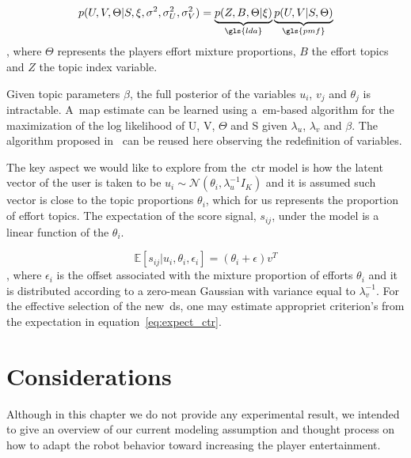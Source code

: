 \begin{equation}
    p(U,V,\Theta|S,\xi,\sigma^{2},\sigma_{U}^{2},\sigma_{V}^{2}) = \underbrace{p(Z,B, \Theta | \xi)}_{\gls{lda}} \underbrace{p(U,V|S,\Theta)}_{\gls{pmf}}
\end{equation}
, where $\Theta$ represents the players effort mixture proportions, $B$ the effort topics and $Z$ the topic index variable. 

Given topic parameters $\beta$, the full posterior of the variables $u_{i}$, $v_{j}$ and $\theta_{j}$ is intractable. A~\gls{map} estimate can be learned using a~\gls{em}-based algorithm for the maximization of the log likelihood of U, V, $\Theta$ and S given $\lambda_{u}$, $\lambda_{v}$ and $\beta$. The algorithm proposed in~\cite{wang_collaborative_2011} can be reused here observing the redefinition of variables. 

The key aspect we would like to explore from the~\gls{ctr} model is how the latent vector of the user is taken to be $u_{i} \sim \mathcal{N}(\theta_{i}, \lambda_{u}^{-1}I_{K})$ and it is assumed such vector is close to the topic proportions $\theta_{i}$, which for us represents the proportion of effort topics. The expectation of the score signal, $s_{ij}$, under the model is a linear function of the $\theta_{i}$.

\begin{equation}
    \mathbb{E}[s_{ij}|u_{i}, \theta_{i}, \epsilon_{i}] = (\theta_{i} + \epsilon)v^{T}
    \label{eq:expect_ctr}
\end{equation}
, where $\epsilon_{i}$ is the offset associated with the mixture proportion of efforts $\theta_{i}$ and it is distributed according to a zero-mean Gaussian with variance equal to $\lambda_{v}^{-1}$. For the effective selection of the new~\gls{ds}, one may estimate appropriet criterion's from the expectation in equation~\ref{eq:expect_ctr}.


\section{Considerations}
Although in this chapter we do not provide any experimental result, we intended to give an overview of our current modeling assumption and thought process on how to adapt the robot behavior toward increasing the player entertainment.

